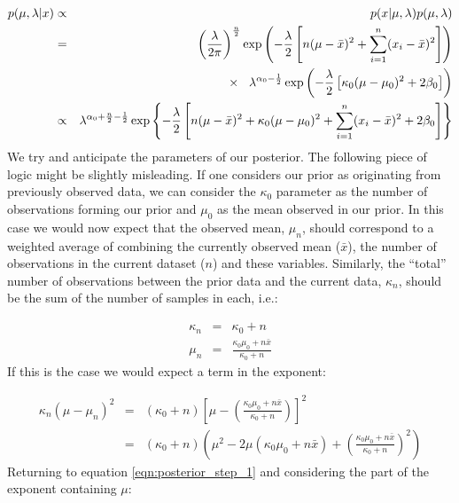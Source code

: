 \documentclass[12pt]{article} %
\begin{document}
	\begin{eqnarray}
	p(\mu, \lambda | x) &\propto& p(x | \mu, \lambda) p(\mu, \lambda) \\
	&=& \left(\frac{\lambda}{2\pi}\right)^{\frac{n}{2}}\exp\left(-\frac{\lambda}{2} \left[n(\mu - \bar{x})^2 + \sum_{i=1}^n (x_i - \bar{x})^2\right] \right) \\
	&& \hspace{3mm} \times \hspace{3mm} \lambda^{\alpha_0 - \frac{1}{2}} \exp\left(-\frac{\lambda}{2}\left[\kappa_0 (\mu - \mu_0)^2 + 2 \beta_0\right]\right) \\
	&\propto&  \lambda^{\alpha_0 + \frac{n}{2} - \frac{1}{2}} \exp \left\{-\frac{\lambda}{2}\left[n(\mu - \bar{x})^2 + \kappa_0(\mu - \mu_0)^2 + \sum_{i=1}^n(x_i - \bar{x})^2 + 2\beta_0\right]\right\} \label{eqn:posterior_step_1}
	\end{eqnarray}
	We try and anticipate the parameters of our posterior. The following piece of logic might be slightly misleading. If one considers our prior as originating from previously observed data, we can consider the $\kappa_0$ parameter as the number of observations forming our prior and $\mu_0$ as the mean observed in our prior. In this case we would now expect that the observed mean, $\mu_n$, should correspond to a weighted average of combining the currently observed mean ($\bar{x}$), the number of observations in the current dataset ($n$) and these variables. Similarly, the ``total'' number of observations  between the prior data and the current data, $\kappa_n$, should be the sum of the number of samples in each, i.e.:
	
	\begin{eqnarray}
	\kappa_n &=& \kappa_0 + n \\
	\mu_n &=& \frac{\kappa_0 \mu_0 + n \bar{x}}{\kappa_0 + n}
	\end{eqnarray}
	If this is the case we would expect a term in the exponent:
	
	\begin{eqnarray}
	\kappa_n (\mu - \mu_n)^2 &=& (\kappa_0 + n)\left[\mu - \left(\frac{\kappa_0 \mu_0 + n \bar{x}}{\kappa_0 + n}\right)\right]^2 \\
	&=& (\kappa_0 + n) \left(\mu^2 - 2\mu(\kappa_0 \mu_0 + n \bar{x}) + \left(\frac{\kappa_0 \mu_0 + n \bar{x}}{\kappa_0 + n}\right)^2\right) %
	\end{eqnarray}
	Returning to equation \ref{eqn:posterior_step_1} and considering the part of the exponent containing $\mu$:
	
\end{document}
